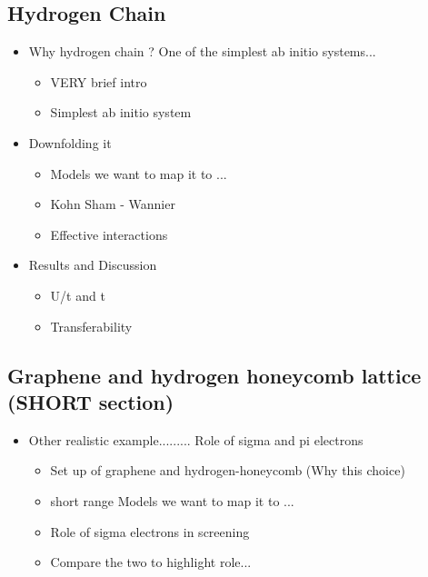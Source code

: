 \documentclass[prl,12pt,onecolumn,nofootinbib,notitlepage,english,superscriptaddress]{revtex4-1}
\newcommand{\HJC}[1]{{\color{RED}{\bf HJC: #1}}}
\newcommand{\lucas}[1]{{\color{GREEN}{\bf LKW: #1}}}
\begin{document}
\subsection{Hydrogen Chain}
\HJC{Huihuo working on this. Extension to simple ab initio problem. Issue with transferability being resolved}
\lucas{I thought that Kiel was also working on this for long-range V} 
\begin{itemize}
	\item Why hydrogen chain ? One of the simplest ab initio systems... 
	\begin{itemize}
		\item VERY brief intro	
		\item Simplest ab initio system 
	\end{itemize}
	\item Downfolding it
	\begin{itemize}
		\item Models we want to map it to ... 
		\item Kohn Sham - Wannier
		\item Effective interactions
	\end{itemize}
\item Results and Discussion
	\begin{itemize}
		\item U/t and t  
		\item Transferability
	\end{itemize}
\end{itemize}

\subsection{Graphene and hydrogen honeycomb lattice (SHORT section)}
\HJC{Huihuo + Hitesh.. Role of screening from other orbitals etc. Highlights importance of core and virtual orbitals. More or less in place...}
\begin{itemize}
	\item Other realistic example......... Role of sigma and pi electrons
	\begin{itemize}
		\item Set up of graphene and hydrogen-honeycomb (Why this choice)
		\item short range Models we want to map it to ... 
		\item Role of sigma electrons in screening 
		\item Compare the two to highlight role... 
	\end{itemize}
\end{itemize}
\end{document}
